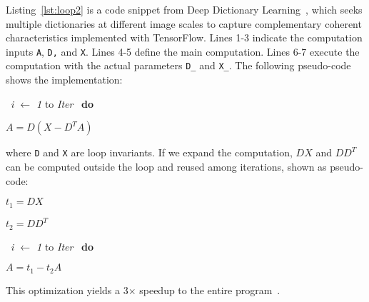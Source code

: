 Listing~\ref{lst:loop2} is a code snippet from Deep Dictionary Learning~\cite{mahdizadehaghdam2019deep}, which seeks multiple dictionaries at different image scales to capture complementary coherent characteristics implemented with TensorFlow. Lines 1-3 indicate the computation inputs {\tt A}, {\tt D,} and {\tt X}. Lines 4-5 define the main computation. Lines 6-7 execute the computation with the actual parameters {\tt D\_} and {\tt X\_}. The following pseudo-code shows the implementation:

\qquad \qquad {} \ {\it i $\leftarrow$ 1}  to  {\it Iter} \ {\bf do}\\
\centerline{$A = D(X - D^T A)$ }
where {\tt D} and {\tt X} are loop invariants. If we expand the computation, $DX$ and $DD^T$ can be computed outside the loop and reused among iterations, shown as pseudo-code:

\qquad \qquad \qquad $t_1 = DX$

\qquad \qquad \qquad $t_2 = DD^T$

\qquad \qquad {} \ {\it i $\leftarrow$ 1}  to  {\it Iter} \ {\bf do}

\centerline{$A = t_1 - t_2 A$ }

This optimization yields a 3$\times$ speedup to the entire program~\cite{zhou2020harp}. 













